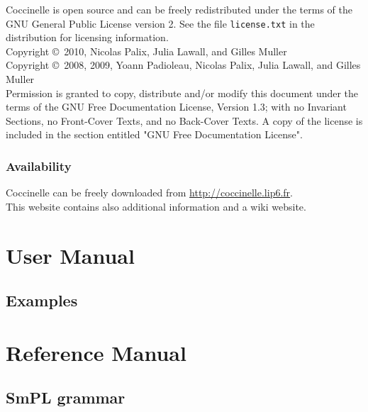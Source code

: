 \documentclass[UTF8]{ctexrep}
\begin{document}
Coccinelle is open source and can be freely redistributed under the
terms of the GNU General Public License version 2. See the file
\verb+license.txt+ in the distribution for licensing information.\\

\noindent
Copyright \copyright~2010,  Nicolas Palix, Julia Lawall, and Gilles Muller\\
Copyright \copyright~2008, 2009, Yoann Padioleau, Nicolas Palix, Julia Lawall, and Gilles Muller\\
    Permission is granted to copy, distribute and/or modify this document
    under the terms of the GNU Free Documentation License, Version 1.3;
    with no Invariant Sections, no Front-Cover Texts, and no Back-Cover Texts.
    A copy of the license is included in the section entitled "GNU
    Free Documentation License".

\section*{Availability}

Coccinelle can be freely downloaded
from \url{http://coccinelle.lip6.fr}.\\
This website contains also additional information and a wiki website.


\part{User Manual}
\label{part:usermanual}







\chapter{Examples}
















\part{Reference Manual}
\label{part:refmanual}

\chapter{SmPL grammar}
\end{document}

